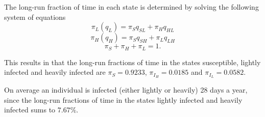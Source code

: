 The long-run fraction of time in each state is determined by solving the following system of equations
$$ \pi_L(q_L) = \pi_S q_{SL} + \pi_H q_{HL}$$
$$ \pi_H(q_H) = \pi_S q_{SH} + \pi_L q_{LH}$$
$$ \pi_S + \pi_H +\pi_L = 1 .$$

This results in that the long-run fractions of time in the states susceptible, lightly infected and heavily infected are $\pi_S = 0.9233$, $\pi_{I_H} = 0.0185$ and $\pi_{I_L} = 0.0582$. 

On average an individual is infected (either lightly or heavily) 28 days a year, since the long-run fractions of time in the states lightly infected and heavily infected sums to $7.67\%$.


